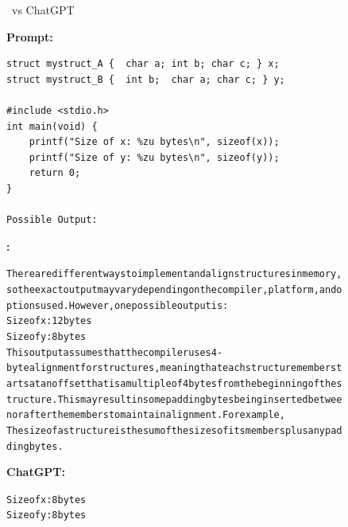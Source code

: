 \begin{figure}[H]
\begin{AIbox}{\DV~vs ChatGPT}

{\bf Prompt:}  


 \begin{verbatim}
struct mystruct_A {  char a; int b; char c; } x;
struct mystruct_B {  int b;  char a; char c; } y;
    
#include <stdio.h>
int main(void) {
    printf("Size of x: %zu bytes\n", sizeof(x)); 
    printf("Size of y: %zu bytes\n", sizeof(y));
    return 0;
}
    
Possible Output:
\end{verbatim}   

\parbox[t]{0.53\linewidth}{{\bf \DV:} 
\tiny
\begin{alltt}
There are different ways to implement and align structures in memory, so the exact output may vary depending on the compiler, platform, and options used. However, one possible output is:\\

Size of x: 12 bytes\\
Size of y: 8 bytes\\

This output assumes that the compiler uses 4-byte alignment for structures, meaning that each structure member starts at an offset that is a multiple of 4 bytes from the beginning of the structure. This may result in some padding bytes being inserted between or after the members to maintain alignment. For example, 
The size of a structure is the sum of the sizes of its members plus any padding bytes.
\end{alltt}
}\hspace{0.02\linewidth}%
\parbox[t]{0.45\linewidth}{{\bf ChatGPT:}
\tiny
\begin{alltt}
Size of x: 8 bytes\\
Size of y: 8 bytes\\


\end{alltt}}
\end{AIbox}
\end{figure}

